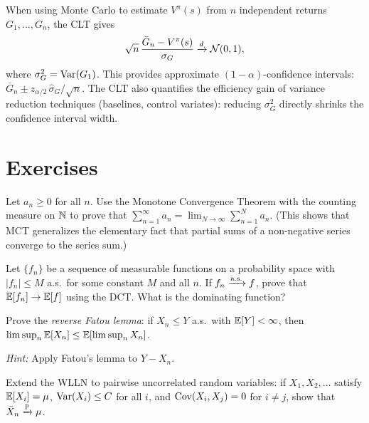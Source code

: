 \documentclass[11pt,a4paper]{article}
\begin{document}
\begin{rlconnection}[title={CLT for Policy Evaluation}]
When using Monte Carlo to estimate $V^\pi(s)$ from $n$
independent returns $G_1, \ldots, G_n$, the CLT gives
\begin{equation}
  \sqrt{n}\,\frac{\bar{G}_n - V^\pi(s)}{\sigma_G}
  \xrightarrow{d} \mathcal{N}(0,1),
\end{equation}
where $\sigma_G^2 = \operatorname{Var}(G_1)$.  This provides
approximate $(1-\alpha)$-confidence intervals:
$\bar{G}_n \pm z_{\alpha/2}\, \hat{\sigma}_G/\sqrt{n}$.
The CLT also quantifies the efficiency gain of variance
reduction techniques (baselines, control variates): reducing
$\sigma_G^2$ directly shrinks the confidence interval width.
\end{rlconnection}


\section{Exercises}
\label{sec:exercises}

\begin{exercise}[(*)]
\label{ex:mct_series}
Let $a_n \geq 0$ for all $n$.  Use the Monotone Convergence
Theorem with the counting measure on $\mathbb{N}$ to prove that
$\sum_{n=1}^\infty a_n = \lim_{N \to \infty} \sum_{n=1}^N a_n$.
(This shows that MCT generalizes the elementary fact that partial
sums of a non-negative series converge to the series sum.)
\end{exercise}

\begin{exercise}[(*)]
\label{ex:dct_bounded}
Let $\{f_n\}$ be a sequence of measurable functions on a
probability space with $|f_n| \leq M$ a.s.\ for some constant
$M$ and all $n$.  If $f_n \xrightarrow{\text{a.s.}} f$, prove that
$\mathbb{E}[f_n] \to \mathbb{E}[f]$ using the DCT.  What is the dominating
function?
\end{exercise}

\begin{exercise}[(**)]
\label{ex:fatou_reverse}
Prove the \emph{reverse Fatou lemma}: if $X_n \leq Y$ a.s.\ with
$\mathbb{E}[Y] < \infty$, then
$\limsup_n \mathbb{E}[X_n] \leq \mathbb{E}[\limsup_n X_n]$.

\noindent\textit{Hint:} Apply Fatou's lemma to $Y - X_n$.
\end{exercise}

\begin{exercise}[(**)]
\label{ex:wlln_pairwise}
Extend the WLLN to pairwise uncorrelated random variables: if
$X_1, X_2, \ldots$ satisfy $\mathbb{E}[X_i] = \mu$,
$\operatorname{Var}(X_i) \leq C$ for all $i$, and
$\operatorname{Cov}(X_i, X_j) = 0$ for $i \neq j$, show that
$\bar{X}_n \xrightarrow{\mathbb{P}} \mu$.
\end{exercise}
\end{document}
